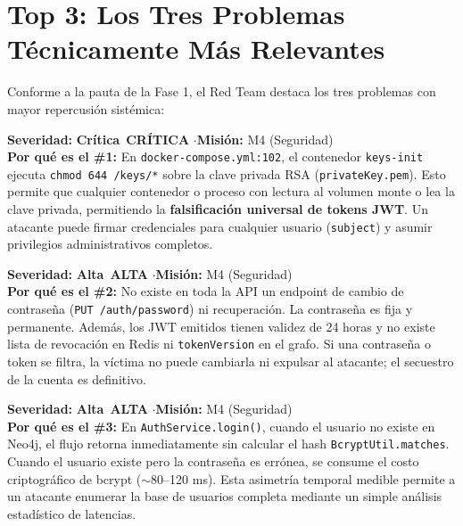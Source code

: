 \documentclass[10pt,a4paper]{article}
\newcommand{\badgeCritica}{\colorbox{red!20}{\textcolor{red!80!black}{\textbf{\footnotesize Crítica}}}}
\newcommand{\badgeAlta}{\colorbox{orange!20}{\textcolor{orange!90!black}{\textbf{\footnotesize Alta}}}}
\begin{document}
\section{Top 3: Los Tres Problemas Técnicamente Más Relevantes}

Conforme a la pauta de la Fase 1, el Red Team destaca los tres problemas con mayor repercusión sistémica:

\begin{tcolorbox}[colback=red!5,colframe=red!60!black,arc=2mm,title=\textbf{TOP 1 · H-10: Clave Privada RSA World-Readable (chmod 644)}]
\textbf{Severidad:} \badgeCritica\ \textbf{CRÍTICA} \quad$\cdot$\quad \textbf{Misión:} M4 (Seguridad)\\
\textbf{Por qué es el \#1:} En \texttt{docker-compose.yml:102}, el contenedor \texttt{keys-init} ejecuta \texttt{chmod 644 /keys/*} sobre la clave privada RSA (\texttt{privateKey.pem}). Esto permite que cualquier contenedor o proceso con lectura al volumen monte o lea la clave privada, permitiendo la \textbf{falsificación universal de tokens JWT}. Un atacante puede firmar credenciales para cualquier usuario (\texttt{subject}) y asumir privilegios administrativos completos.
\end{tcolorbox}

\begin{tcolorbox}[colback=orange!5,colframe=orange!80!black,arc=2mm,title=\textbf{TOP 2 · H-28: Credencial Inmutable y Sesiones JWT Irrevocables}]
\textbf{Severidad:} \badgeAlta\ \textbf{ALTA} \quad$\cdot$\quad \textbf{Misión:} M4 (Seguridad)\\
\textbf{Por qué es el \#2:} No existe en toda la API un endpoint de cambio de contraseña (\texttt{PUT /auth/password}) ni recuperación. La contraseña es fija y permanente. Además, los JWT emitidos tienen validez de 24 horas y no existe lista de revocación en Redis ni \texttt{tokenVersion} en el grafo. Si una contraseña o token se filtra, la víctima no puede cambiarla ni expulsar al atacante; el secuestro de la cuenta es definitivo.
\end{tcolorbox}

\begin{tcolorbox}[colback=orange!5,colframe=orange!80!black,arc=2mm,title=\textbf{TOP 3 · H-11: Enumeración de Usuarios por Timing Attack en Login}]
\textbf{Severidad:} \badgeAlta\ \textbf{ALTA} \quad$\cdot$\quad \textbf{Misión:} M4 (Seguridad)\\
\textbf{Por qué es el \#3:} En \texttt{AuthService.login()}, cuando el usuario no existe en Neo4j, el flujo retorna inmediatamente sin calcular el hash \texttt{BcryptUtil.matches}. Cuando el usuario existe pero la contraseña es errónea, se consume el costo criptográfico de bcrypt ($\sim$80--120 ms). Esta asimetría temporal medible permite a un atacante enumerar la base de usuarios completa mediante un simple análisis estadístico de latencias.
\end{tcolorbox}
\end{document}

